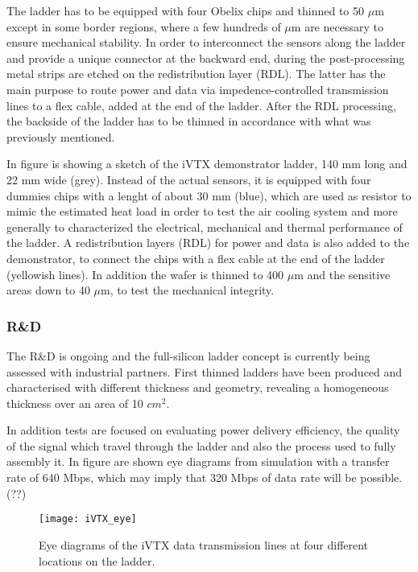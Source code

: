 The ladder has to be equipped with four Obelix chips and thinned to 50 $\mu$m except in some border regions, where a few hundreds of $\mu$m are necessary to ensure mechanical stability. 
In order to interconnect the sensors along the ladder and provide a unique connector at the backward end, during the post-processing metal strips are etched on the redistribution layer (RDL). The latter has the main purpose to route power and data via impedence-controlled transmission lines to a flex cable, added at the end of the ladder.
After the RDL processing, the backside of the ladder has to be thinned in accordance with what was previously mentioned.


In figure  is showing a sketch of the iVTX demonstrator ladder, 140 mm long and 22 mm wide (grey). Instead of the actual sensors, it is equipped with four dummies chips with a lenght of about 30 mm (blue), which are used as resistor to mimic the estimated heat load in order to test the air cooling system and more generally to characterized the electrical, mechanical and thermal performance of the ladder.
A redistribution layers (RDL) for power and data is also added to the demonstrator, to connect the chips with a flex cable at the end of the ladder (yellowish lines). In addition the wafer is thinned to 400 $\mu$m and the sensitive areas down to 40 $\mu$m, to test the mechanical integrity.


\subsubsection{R\&D}

The R\&D is ongoing and the full-silicon ladder concept is currently being assessed with industrial partners. First thinned ladders have been produced and characterised with different thickness and geometry, revealing a homogeneous thickness over an area of 10 $cm^{2}$. 

In addition tests are focused on evaluating power delivery efficiency, the quality of the signal which travel through the ladder and also the process used to fully assembly it. 
In figure  are shown eye diagrams from simulation with a transfer rate of 640 Mbps, which may imply that 320 Mbps of data rate will be possible. (??) 

\begin{figure}[h!]
\centering
\texttt{[image: iVTX\_eye]}
\caption{Eye diagrams of the iVTX data transmission lines at four different locations on the ladder.}
\label{fig:iVTX_eye}
\end{figure}

